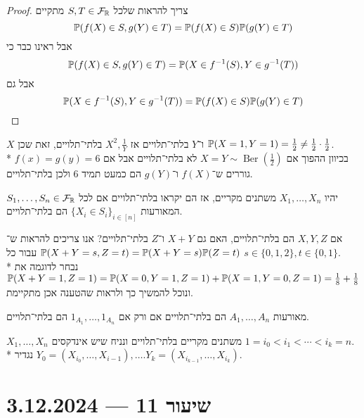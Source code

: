 \begin{proof}
	צריך להראות שלכל $S, T \in \mathcal{F}_{\mathbb{R}}$ מתקיים
	\[
		\mathbb{P}(f(X) \in S, g(Y) \in T) = \mathbb{P}(f(X) \in S) \mathbb{P}(g(Y) \in T)
	\]
	אבל ראינו כבר כי
	\[
		\mathbb{P}(f(X) \in S, g(Y) \in T) = \mathbb{P}(X \in f^{-1}(S), Y \in g^{-1}(T))
	\]
	אבל גם
	\[
		\mathbb{P}(X \in f^{-1}(S), Y \in g^{-1}(T)) = \mathbb{P}(f(X) \in S) \mathbb{P}(g(Y) \in T)
	\]
\end{proof}
\begin{example}
	$X$ ו־$Y$ בלתי־תלויים אז $X^2, \frac{1}{Y}$ בלתי־תלויים, זאת שכן $\mathbb{P}(X = 1, Y = 1) = \frac{1}{2} \ne \frac{1}{2} \cdot \frac{1}{2}$. \\*
	בכיוון ההפוך אם $X = Y \sim \operatorname{Ber}(\frac{1}{2})$ לא בלתי־תלויים אבל אם $f(x) = g(y) = 6$ גוררים ש־$f(X)$ ו־$g(Y)$ הם כמעט תמיד 6 ולכן בלתי־תלויים.
\end{example}
\begin{definition}
	יהיו $X_1, \dots, X_n$ משתנים מקריים, אז הם יקראו בלתי־תלויים אם לכל $S_1, \dots, S_n \in \mathcal{F}_{\mathbb{R}}$ המאורעות ${\{ X_i \in S_i \}}_{i \in [n]}$ הם בלתי־תלויים.
\end{definition}
\begin{example}
	אם $X, Y, Z$ הם בלתי־תלויים, האם גם $X + Y$ ו־$Z$ בלתי־תלויים?
	אנו צריכים להראות ש־$\mathbb{P}(X + Y = s, Z = t) = \mathbb{P}(X + Y = s) \mathbb{P}(Z = t)$ עבור כל $s \in \{0, 1, 2\}, t \in \{0, 1\}$. \\*
	נבחר לדוגמה את $\mathbb{P}(X + Y = 1, Z = 1) = \mathbb{P}(X = 0, Y = 1, Z = 1) + \mathbb{P}(X = 1, Y = 0, Z = 1) = \frac{1}{8} + \frac{1}{8}$ ונוכל להמשיך כך ולראות שהטענה אכן מתקיימת.
\end{example}
\begin{exercise}
	מאורעות $A_1, \dots, A_n$ הם בלתי־תלויים אם ורק אם $1_{A_1}, \dots, 1_{A_n}$ הם בלתי־תלויים.
\end{exercise}
\begin{proposition}
	$X_1, \dots, X_n$ משתנים מקריים בלתי־תלויים ונניח שיש אינדקסים $1 = i_0 < i_1 < \cdots < i_k = n$. \\*
	נגדיר $Y_0 = (X_{i_0}, \dots, X_{i - 1}), \dots. Y_k = (X_{i_{k - 1}}, \dots, X_{i_k})$.
\end{proposition}

\section{שיעור 11 --- 3.12.2024}

